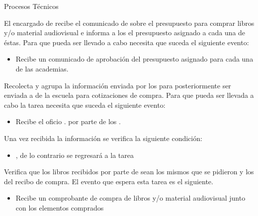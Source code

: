 \begin{PDescripcion}

  \Ppaso Procesos Técnicos

    \begin{enumerate}

      \Ppaso[\itarea]  El encargado de   recibe el comunicado de  sobre el presupuesto para comprar libros y/o material audiovisual e informa a los  el presupuesto asignado a cada una de éstas. Para que pueda ser llevado a cabo necesita que suceda el siguiente evento:


	\begin{itemize}
	  \item Recibe un comunicado de aprobación del presupuesto asignado para cada una de las academias.	
	\end{itemize}

      \Ppaso[\itarea]  Recolecta y agrupa la información enviada por los  para posteriormente ser enviada a  de la escuela para cotizaciones de compra. Para que pueda ser llevada a cabo la tarea necesita que suceda el siguiente evento:

	\begin{itemize}
	  \item Recibe el oficio . por parte de los .
	  
	\end{itemize}
	
	Una vez recibida la información se verifica la siguiente condición:
	
	\begin{itemize}
	  \item {}, de lo contrario se regresará a la tarea 
	\end{itemize}
	
	\Ppaso[\itarea] Verifica que los libros recibidos por parte de  sean los mismos que se pidieron y los del recibo de compra. El evento que espera esta tarea es el siguiente.
	\begin{itemize}
	  \item Recibe un comprobante de compra de libros y/o material audiovisual junto con los elementos comprados
	 \end{itemize}
	 
	
	


    \end{enumerate}

\end{PDescripcion}
